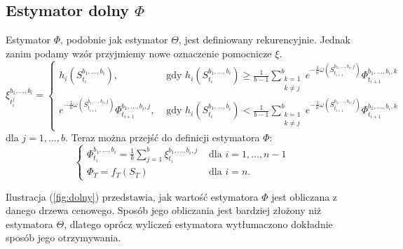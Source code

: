 \documentclass[]{pwr_wmat_praca_dyplomowa}
\theoremstyle{plain}
\numberwithin{theorem}{chapter}
\theoremstyle{definition}
\numberwithin{theorem}{chapter}
\begin{document}
\subsection{Estymator dolny $\Phi$}

Estymator $\Phi$, podobnie jak estymator $\Theta$, jest  definiowany rekurencyjnie. Jednak zanim podamy wzór przyjmiemy nowe oznaczenie pomocnicze $\xi$.
\begin{equation}
\label{eq:ksi}
\xi_{t_i^j}^{b_1,\ldots, b_i} = \left\{ \begin{array}{ll}
h_i(S_{t_i}^{b_1,\ldots, b_i}), & \textrm{ gdy }h_i(S_{t_i}^{b_1,\ldots, b_i}) \geq \frac{1}{b-1} \sum_{\substack{k = 1\\k \neq j}}^b e^{-\frac{1}{n}\omega(S_{t_{i+1}}^{b_1,\ldots,b_i,j})} \Phi_{t_{i+1}}^{b_1,\ldots, b_i,k}\\
e^{-\frac{1}{n}\omega(S_{t_{i+1}}^{b_1,\ldots,b_i,j})} \Phi_{t_{i+1}}^{b_1,\ldots, b_i,j}, & \textrm{ gdy }h_i(S_{t_i}^{b_1,\ldots, b_i}) < \frac{1}{b-1} \sum_{\substack{k = 1\\k \neq j}}^b e^{-\frac{1}{n}\omega(S_{t_{i+1}}^{b_1,\ldots,b_i,j})} \Phi_{t_{i+1}}^{b_1,\ldots, b_i,k}
\end{array} \right.
\end{equation}
dla $j=1,\ldots,b$. Teraz można przejść do definicji estymatora $\Phi$:
\begin{equation}
\label{eq:dolny}
\left\{ \begin{array}{ll}
\Phi_{t_i}^{b_1,\ldots,b_i} = \frac{1}{b} \sum_{j=1}^b \xi_{t_i}^{b_1,\ldots,b_i,j} & \textrm{ dla } i =1,\ldots,n-1\\
\Phi_T = f_T(S_T) & \textrm{ dla } i=n.
\end{array} \right.
\end{equation}

\noindent Ilustracja (\ref{fig:dolny}) przedstawia, jak wartość estymatora $\Phi$ jest obliczana z danego drzewa cenowego. Sposób jego obliczania jest bardziej złożony niż estymatora $\Theta$, dlatego oprócz wyliczeń estymatora wytłumaczono dokładnie sposób jego otrzymywania. 
\end{document}
